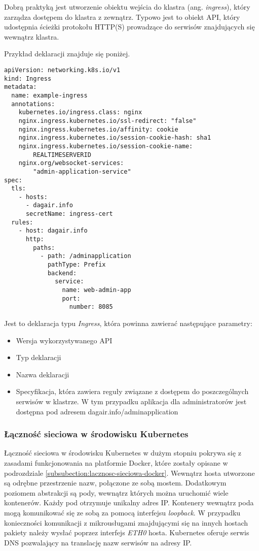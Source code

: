 Dobrą praktyką jest utworzenie obiektu wejścia do klastra (ang. \textit{ingress}), który 
zarządza dostępem do klastra z zewnątrz. Typowo jest to obiekt API, który udostępnia 
ścieżki protokołu HTTP(S) prowadzące do serwisów znajdujących się wewnątrz klastra.

Przykład deklaracji znajduje się poniżej.

\begin{lstlisting}
apiVersion: networking.k8s.io/v1
kind: Ingress
metadata:
  name: example-ingress
  annotations:
    kubernetes.io/ingress.class: nginx
    nginx.ingress.kubernetes.io/ssl-redirect: "false"
    nginx.ingress.kubernetes.io/affinity: cookie
    nginx.ingress.kubernetes.io/session-cookie-hash: sha1
    nginx.ingress.kubernetes.io/session-cookie-name: 
        REALTIMESERVERID
    nginx.org/websocket-services: 
        "admin-application-service"
spec:
  tls:
    - hosts:
      - dagair.info
      secretName: ingress-cert
  rules:
    - host: dagair.info
      http:
        paths:
          - path: /adminapplication
            pathType: Prefix
            backend:
              service:
                name: web-admin-app
                port:
                  number: 8085
\end{lstlisting}

Jest to deklaracja typu \textit{Ingress}, która powinna zawierać następujące parametry:

\begin{itemize} %
    \item Wersja wykorzystywanego API
    \item Typ deklaracji
    \item Nazwa deklaracji
    \item Specyfikacja, która zawiera reguły związane z dostępem do poszczególnych 
    serwisów w klastrze. W tym przypadku aplikacja dla administratorów jest dostępna 
    pod adresem dagair.info/adminapplication
\end{itemize}

\subsubsection{Łączność sieciowa w środowisku Kubernetes}

Łączność sieciowa w środowisku Kubernetes w dużym stopniu pokrywa się z zasadami funkcjonowania
na platformie Docker, które zostały opisane w podrozdziale \ref{subsubection:lacznosc-sieciowa-docker}.
Wewnątrz hosta utworzone są odrębne przestrzenie nazw, połączone ze sobą mostem. Dodatkowym poziomem
abstrakcji są pody, wewnątrz których można uruchomić wiele kontenerów. Każdy pod otrzymuje unikalny adres
IP. Kontenery wewnątrz poda mogą komunikować się ze sobą za pomocą interfejsu \textit{loopback}.
W przypadku konieczności komunikacji z mikrousługami znajdującymi się na innych hostach pakiety
należy wysłać poprzez interfejs \textit{ETH0} hosta. 
Kubernetes oferuje serwis DNS pozwalający na translację nazw serwisów na adresy IP.

